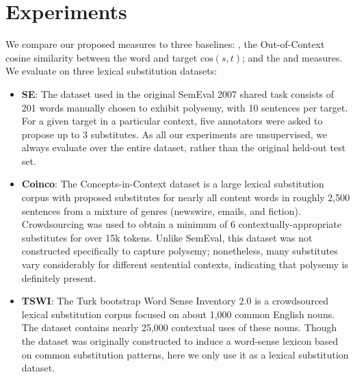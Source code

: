 \section{Experiments}
We compare our proposed measures to three baselines: \ooc, the Out-of-Context
cosine similarity between the word and target $\mbox{cos}(s, t)$; and the
\mbox{\addCos} and \mbox{\balAddCos} measures.
We evaluate on three lexical substitution datasets:
\begin{itemize}
\item {\bf SE}: The dataset used in the original SemEval 2007 shared task
\cite{mccarthy:2007:semeval} consists of 201 words manually chosen to exhibit
polysemy, with 10 sentences per target. For a given target in a particular
context, five annotators were asked to propose up to 3 substitutes. As all our
experiments are unsupervised, we always evaluate over the entire dataset,
rather than the original held-out test set.
\item {\bf Coinco}: The Concepts-in-Context dataset \cite{kremer:2014:eacl} is a
large lexical substitution corpus with proposed substitutes for nearly all
content words in roughly 2,500 sentences from a mixture of genres (newswire,
emails, and fiction). Crowdsourcing was used to obtain a minimum of 6
contextually-appropriate substitutes for over 15k tokens. Unlike SemEval, this
dataset was not constructed specifically to capture polysemy; nonetheless,
many substitutes vary considerably for different sentential contexts,
indicating that polysemy is definitely present.
\item {\bf TSWI}: The Turk bootstrap Word Sense Inventory 2.0 \cite{biemann:2012:lrec}
is a crowdsourced lexical substitution corpus focused on about 1,000 common
English nouns. The dataset contains nearly 25,000 contextual uses of these
nouns. Though the dataset was originally constructed to induce a word-sense
lexicon based on common substitution patterns, here we only use it as a
lexical substitution dataset.
\end{itemize}

